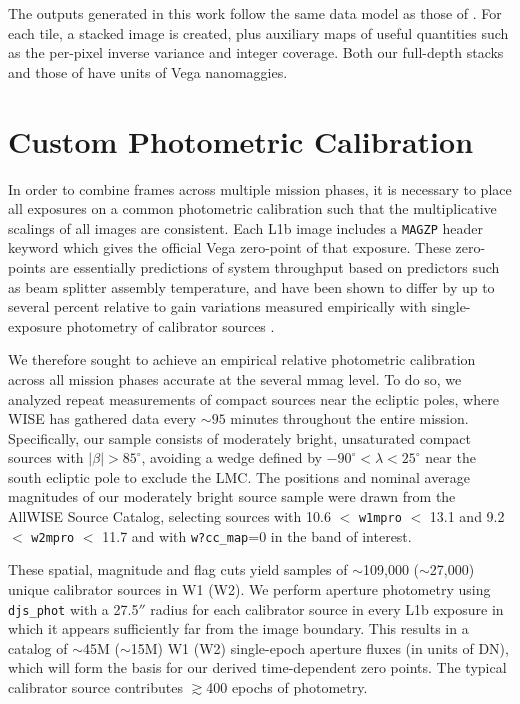 \documentclass{emulateapj}
\begin{document}
The outputs generated in this work follow the same data model as those of 
\cite{lang14}. For each tile, a stacked image is created, plus auxiliary
maps of useful quantities such as the per-pixel inverse variance and integer 
coverage. Both our full-depth stacks and those of \cite{lang14} have units of 
Vega nanomaggies.

\section{Custom Photometric Calibration}
\label{sec:calib}
In order to combine frames across multiple mission phases, it is necessary
to place all exposures on a common photometric calibration such that
the multiplicative scalings of all images are consistent. Each L1b
image includes a \verb|MAGZP| header keyword which gives the official
Vega zero-point of that exposure. These zero-points are essentially
predictions of system throughput based on predictors such as beam splitter
assembly temperature, and have been shown to differ by up to several percent 
relative to gain variations measured empirically with single-exposure
photometry of calibrator sources \citep{cutri13, cutri15}.

We therefore sought to achieve an empirical relative photometric calibration
across all mission phases accurate at the several mmag level. To do so, we 
analyzed repeat measurements of compact sources near the 
ecliptic poles, where WISE has gathered data every $\sim$$95$ minutes 
throughout the entire mission. Specifically, our sample consists of moderately 
bright, unsaturated compact sources with $|\beta| > 85^{\circ}$, avoiding a 
wedge defined by $-90^{\circ}$$<$$\lambda$$<25^{\circ}$ near the south ecliptic
pole to exclude the LMC. The positions and nominal average magnitudes of our 
moderately bright source sample were drawn from the AllWISE Source Catalog, 
selecting sources with 10.6 $<$ \verb|w1mpro| $<$ 13.1 and 9.2 $<$ 
\verb|w2mpro| $<$ 11.7 and with \verb|w?cc_map|=0 in the band of interest.

These spatial, magnitude and flag cuts yield samples of $\sim$109,000 
($\sim$27,000) unique calibrator sources in W1 (W2). We perform aperture 
photometry using \verb|djs_phot| with a 27.5$''$ radius for each calibrator 
source in every L1b exposure in which it appears sufficiently far from the 
image boundary. This results in a catalog of $\sim$45M ($\sim$15M) W1 (W2) 
single-epoch aperture fluxes (in units of DN), which will form the basis for 
our derived time-dependent zero points. The typical calibrator source 
contributes $\gtrsim$400 epochs of photometry.
\end{document}
